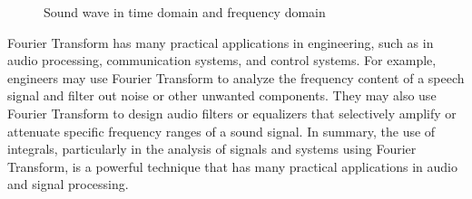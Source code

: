 \documentclass[13pt,a4paper]{report}
\begin{document}

\vspace{0.45cm}

\begin{figure}[H]
    \begin{center}
        
    \end{center}
    \caption{Sound wave in time domain and frequency domain}
\end{figure}

Fourier Transform has many practical applications in engineering, such as in audio processing, communication systems, and control systems. For example, engineers may use Fourier Transform to analyze the frequency content of a speech signal and filter out noise or other unwanted components. They may also use Fourier Transform to design audio filters or equalizers that selectively amplify or attenuate specific frequency ranges of a sound signal. In summary, the use of integrals, particularly in the analysis of signals and systems using Fourier Transform, is a powerful technique that has many practical applications in audio and signal processing.




\end{document}
